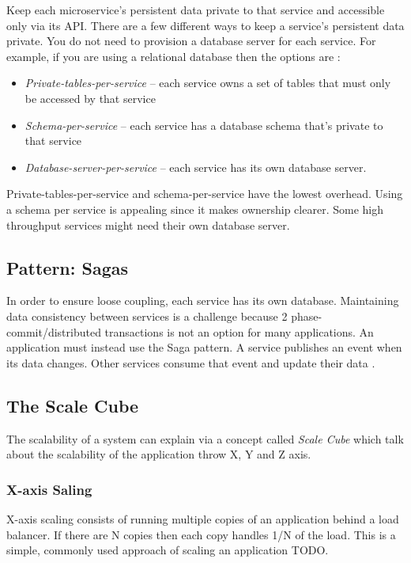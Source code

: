 Keep each microservice’s persistent data private to that service and accessible only via its API. 
There are a few different ways to keep a service’s persistent data private. You do not need to provision a database server for each service. For example, if you are using a relational database then the options are \cite{RichardsonMicroservicesService}:
\begin{itemize}
    \item \emph{Private-tables-per-service} – each service owns a set of tables that must only be accessed by that service
    \item \emph{Schema-per-service} – each service has a database schema that’s private to that service
    \item \emph{Database-server-per-service} – each service has its own database server.
\end{itemize}
Private-tables-per-service and schema-per-service have the lowest overhead. Using a schema per service is appealing since it makes ownership clearer. Some high throughput services might need their own database server.

\subsection{Pattern: Sagas}
\label{subse:sagas}
In order to ensure loose coupling, each service has its own database. Maintaining data consistency between services is a challenge because 2 phase-commit/distributed transactions is not an option for many applications. An application must instead use the Saga pattern. A service publishes an event when its data changes. Other services consume that event and update their data \cite{RichardsonMicroservicesSagas}.

\subsection{The Scale Cube}
\label{subse:scale_cube}
The scalability of a system can explain via a concept called \emph{Scale Cube} which talk about the scalability of the application throw X, Y and Z axis.

\subsubsection{X-axis Saling}
X-axis scaling consists of running multiple copies of an application behind a load balancer. If there are N copies then each copy handles 1/N of the load. This is a simple, commonly used approach of scaling an application TODO.

